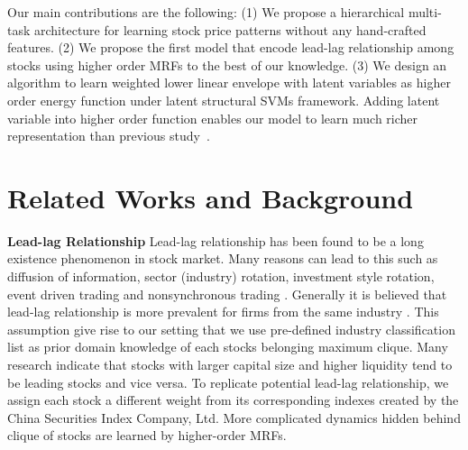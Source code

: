 \documentclass[sigconf, anonymous, review]{acmart}
\renewcommand{\cite}{\citep}
\begin{document}
Our main contributions are the following: (1) We propose a
hierarchical multi-task architecture for learning stock price
patterns without any hand-crafted features. (2) We propose the
first model that encode lead-lag relationship among stocks using
higher order MRFs to the best of our knowledge. (3) We design an
algorithm to learn weighted lower linear envelope with latent
variables as higher order energy function under latent structural
SVMs framework. Adding latent variable into higher order function
enables our model to learn much richer representation than
previous study~\cite{gouldlearning}.

\section{Related Works and Background}
\label{sec:background}

\textbf{Lead-lag Relationship} Lead-lag relationship has been
found to be a long existence phenomenon in stock market. Many
reasons can lead to this such as diffusion of information, sector
(industry) rotation, investment style rotation, event driven
trading and nonsynchronous trading
\cite{lo1990contrarian,chordia2000trading,conrad1988time,hameed1997time}.
Generally it is believed that lead-lag relationship is more
prevalent for firms from the same industry
\cite{hou2007industry}. This assumption give rise to our setting
that we use pre-defined industry classification list \cite{ths}
as prior domain knowledge of each stock\textquotesingle s belonging maximum
clique. Many research \cite{brennan1993investment,hou2007industry,badrinath1995shepherds,mcqueen1996delayed}
indicate that stocks with larger capital
size and higher liquidity tend to be leading stocks and vice versa.
To replicate potential lead-lag relationship, we assign each stock a
different weight from its corresponding indexes created by the China 
Securities Index Company, Ltd. More complicated dynamics hidden behind clique
of stocks are learned by higher-order MRFs.
\end{document}
